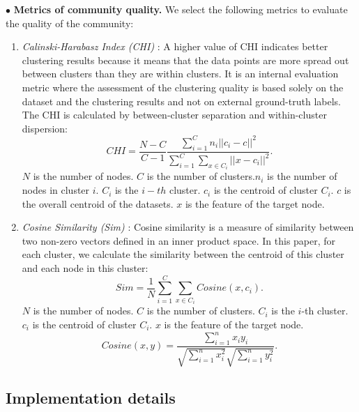 $\bullet$ \textbf{Metrics of community quality. } We select the following metrics to evaluate the quality of the community:
\begin{enumerate}
    \item \textit{Calinski-Harabasz Index (CHI)} \cite{calinski1974CHIndex}: A higher value of CHI indicates better clustering results because it means that the data points are more spread out between clusters than they are within clusters. It is an internal evaluation metric where the assessment of the clustering quality is based solely on the dataset and the clustering results and not on external ground-truth labels. The CHI is calculated by between-cluster separation and within-cluster dispersion:
    \begin{equation}
    CHI = \frac{N-C}{C-1}\frac{\sum^{C}_{i=1}n_i||c_i-c||^2}{\sum^{C}_{i=1}\sum_{x \in C_i}||x-c_i||^2}.
    \end{equation}
    $N$ is the number of nodes. $C$ is the number of clusters.$n_i$ is the number of nodes in cluster $i$. $C_i$ is the $i-th$ cluster. $c_i$ is the centroid of cluster $C_i$. $c$ is the overall centroid of the datasets. $x$ is the feature of the target node.
    
    \item \textit{Cosine Similarity (Sim)} \cite{charikar2002similarity}: Cosine similarity is a measure of similarity between two non-zero vectors defined in an inner product space. In this paper, for each cluster, we calculate the similarity between the centroid of this cluster and each node in this cluster:
    \begin{equation}
    Sim = \frac{1}{N}\sum^{C}_{i=1}\sum_{x \in C_i}Cosine(x, c_i).
    \end{equation}
    $N$ is the number of nodes. $C$ is the number of clusters. $C_i$ is the $i$-th cluster. $c_i$ is the centroid of cluster $C_i$. $x$ is the feature of the target node.
    \begin{equation}
    Cosine(x, y) = \frac{\sum_{i=1}^{n}x_i y_i}{\sqrt{\sum_{i=1}^{n}x_i^2}\sqrt{\sum_{i=1}^{n}y_i^2}}.
    \end{equation}
\end{enumerate}





\subsection{Implementation details}
\label{sec:imp}

